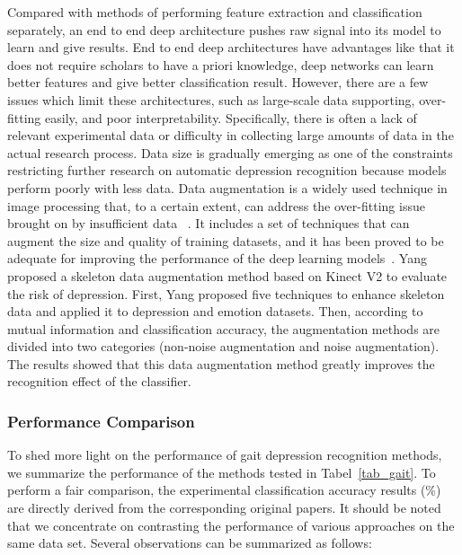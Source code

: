 Compared with methods of performing feature extraction and classification separately, an end to end deep architecture pushes raw signal into its model to learn and give results.
End to end deep architectures have advantages like that it does not require scholars to have a priori
knowledge, deep networks can learn better features and give better classification result.
However, there are a few issues which limit these architectures, such as large-scale data supporting, over-fitting easily, and poor interpretability.
Specifically, there is often a lack of relevant experimental data or difficulty in collecting large amounts of data in the actual research process.
Data size is gradually emerging as one of the constraints restricting further research on automatic depression recognition because models perform poorly with less data.
Data augmentation is a widely used technique in image processing that, to a certain extent, can address the over-fitting issue brought on by insufficient data ~\cite{zhong2020random,cubuk2018autoaugment,cubuk2019autoaugment}.
It includes a set of techniques that can augment the size and quality of training datasets, and it has been proved to be adequate for improving the performance of the deep learning models~\cite{hussain2017differential}.
Yang \cite{yang2022data} proposed a skeleton data augmentation method based on Kinect V2 to evaluate the risk of depression. First, Yang proposed five techniques to enhance skeleton data and applied it to depression and emotion datasets. Then, according to mutual information and classification accuracy, the augmentation methods are divided into two categories (non-noise augmentation and noise augmentation). The results showed that this data augmentation method greatly improves the recognition effect of the classifier.



\subsubsection{Performance Comparison}
To shed more light on the performance of gait depression recognition methods, we summarize the performance of the methods tested in Tabel~\ref{tab_gait}.
To perform a fair comparison, the experimental classification accuracy results (\%) are directly derived from the corresponding original papers.
It should be noted that we concentrate on contrasting the performance of various approaches on the same data set.
Several observations can be summarized as follows:


